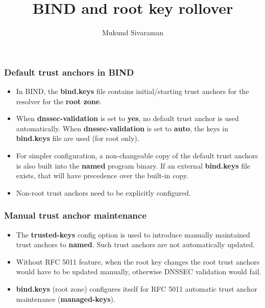 \documentclass{beamer}
\title{BIND and root key rollover}
\author{Mukund Sivaraman}
\institute{Internet Systems Consortium}
\date{}
\begin{document}
\frame{\titlepage}

\frame
{
  \frametitle{Default trust anchors in BIND}

  \begin{itemize}

  \item In BIND, the \textbf{bind.keys} file contains initial/starting
    trust anchors for the resolver for the \textbf{root zone}.

  \item When \textbf{dnssec-validation} is set to \textbf{yes}, no
    default trust anchor is used automatically. When
    \textbf{dnssec-validation} is set to \textbf{auto}, the keys in
    \textbf{bind.keys} file are used (for root only).

  \item For simpler configuration, a non-changeable copy of the default
    trust anchors is also built into the \textbf{named} program
    binary. If an external \textbf{bind.keys} file exists, that will
    have precedence over the built-in copy.

  \item Non-root trust anchors need to be explicitly configured.

  \end{itemize}
}

\frame
{
  \frametitle{Manual trust anchor maintenance}

  \begin{itemize}
  \item The \textbf{trusted-keys} config option is used to introduce
    manually maintained trust anchors to \textbf{named}. Such trust
    anchors are not automatically updated.

  \item Without RFC 5011 feature, when the root key changes the root
    trust anchors would have to be updated manually, otherwise DNSSEC
    validation would fail.

  \item \textbf{bind.keys} (root zone) configures itself for RFC 5011
    automatic trust anchor maintenance (\textbf{managed-keys}).

  \end{itemize}
}
\end{document}
